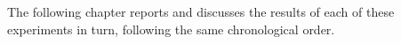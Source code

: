 \documentclass[12pt,a4paper]{report}
\begin{document}
{%


\noindent The following chapter reports and discusses the results of each of these
experiments in turn, following the same chronological order.

}
\end{document}
